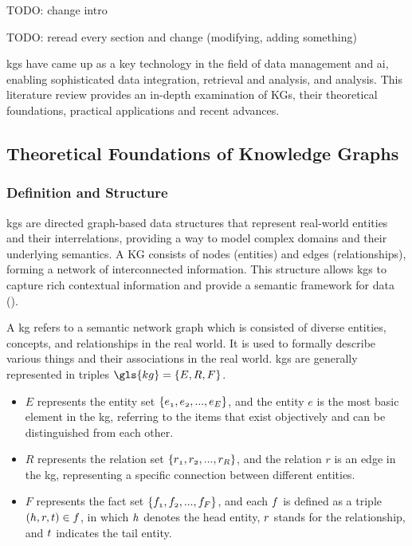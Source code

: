 TODO: change intro

TODO: reread every section and change (modifying, adding something)

\glspl{kg} have came up as a key technology in the field of data management and \gls{ai}, enabling sophisticated data integration, retrieval and analysis, and analysis. This literature review provides an in-depth examination of KGs, their theoretical foundations, practical applications and recent advances.
\subsection*{Theoretical Foundations of Knowledge Graphs}
\subsubsection*{Definition and Structure}
\glspl{kg} are directed graph-based data structures that represent real-world entities and their interrelations, providing a way to model complex domains and their underlying semantics. A KG consists of nodes (entities) and edges (relationships), forming a network of interconnected information. This structure allows \glspl{kg} to capture rich contextual information and provide a semantic framework for data (\cite{Hogan2021}).

A \gls{kg} refers to a semantic network graph which is consisted of diverse entities, concepts, and relationships in the real world. It is used to formally describe various things and their associations in the real world.
\glspl{kg} are generally represented in triples $\gls{kg}=\{\mathnormal{E,R,F}\}$.
    \begin{itemize}
        \item $E$ represents the entity set $\{\mathnormal{e_1, e_2, ... ,e_E} \}$, and the entity $e$ is the most basic element in the \gls{kg}, referring to the items that exist objectively and can be distinguished from each other.
        \item $R$ represents the relation set $\{\mathnormal{r_1, r_2, ... ,r_R}\}$, and the relation $r$ is an edge in the \gls{kg}, representing a specific connection between different entities.
        \item $F$ represents the fact set $\{\mathnormal{f_1,f_2, ... ,f_F}\}$, and each $\mathnormal{f}$ is defined as a triple $(\mathnormal{h,r,t}) \in \mathnormal{f}$, in which $\mathnormal{h}$ denotes the head entity, $\mathnormal{r}$ stands for the relationship, and $\mathnormal{t}$ indicates the tail entity.
    \end{itemize}

